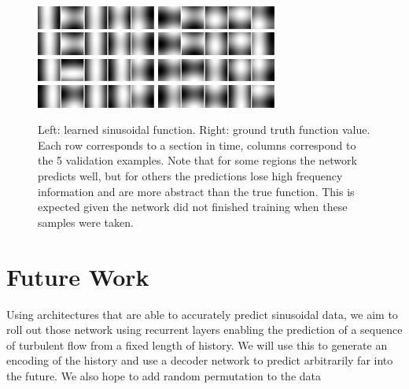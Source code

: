 \documentclass[10pt,letterpaper]{article}
\begin{document}
\begin{figure}
	\begin{center}
		\includegraphics[width=0.35\textwidth]{images/sin_0.PNG}
		\includegraphics[width=0.35\textwidth]{images/sin_lab_0.PNG}
		\includegraphics[width=0.35\textwidth]{images/sin_5.PNG}
		\includegraphics[width=0.35\textwidth]{images/sin_lab_5.PNG}
		\includegraphics[width=0.35\textwidth]{images/sin_10.PNG}
		\includegraphics[width=0.35\textwidth]{images/sin_lab_10.PNG}	
		\includegraphics[width=0.35\textwidth]{images/sin_15.PNG} 
		\includegraphics[width=0.35\textwidth]{images/sin_lab_15.PNG}
		\caption{\small Left: learned sinusoidal function. Right: ground truth function value. Each row corresponds to a section in time, columns correspond to the 5 validation examples. Note that for some regions the network predicts well, but for others the predictions lose high frequency information and are more abstract than the true function. This is expected given the network did not finished training when these samples were taken.}	
		\label{sin_perf}
	\end{center}	
\end{figure}


\section{Future Work}
Using architectures that are able to accurately predict sinusoidal data, we aim to roll out those network using recurrent layers enabling the prediction of a sequence of turbulent flow from a fixed length of history. We will use this to generate an encoding of the history and use a decoder network to predict arbitrarily far into the future. We also hope to add random permutation to the data 
\end{document}
